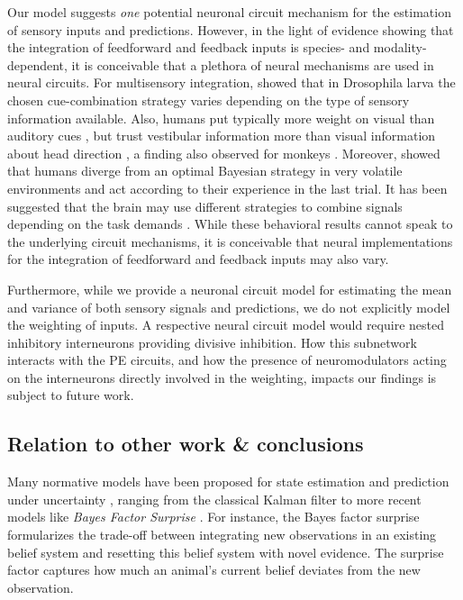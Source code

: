 \documentclass[10pt,a4paper]{article}
\begin{document}
Our model suggests \textit{one} potential neuronal circuit mechanism for the estimation of sensory inputs and predictions. However, in the light of evidence showing that the integration of feedforward and feedback inputs is species- and modality-dependent, it is conceivable that a plethora of neural mechanisms are used in neural circuits. For multisensory integration, \cite{wong2023computational} showed that in Drosophila larva the chosen cue-combination strategy varies depending on the type of sensory information available. Also, humans put typically more weight on visual than auditory cues \citep{battaglia2003bayesian, alais2004ventriloquist}, but trust vestibular information more than visual information about head direction \citep{butler2010bayesian}, a finding also observed for monkeys \citep{fetsch2009dynamic}. Moreover, \cite{summerfield2011perceptual} showed that humans diverge from an optimal Bayesian strategy in very volatile environments and act according to their experience in the last trial. It has been suggested that the brain may use different strategies to combine signals depending on the task demands \citep{o2012can}. While these behavioral results cannot speak to the underlying circuit mechanisms, it is conceivable that neural implementations for the integration of feedforward and feedback inputs may also vary.

Furthermore, while we provide a neuronal circuit model for estimating the mean and variance of both sensory signals and predictions, we do not explicitly model the weighting of inputs. A respective neural circuit model would require nested inhibitory interneurons providing divisive inhibition. How this subnetwork interacts with the PE circuits, and how the presence of neuromodulators acting on the interneurons directly involved in the weighting, impacts our findings is subject to future work. 


\subsection*{Relation to other work \& conclusions}
%
Many normative models have been proposed for state estimation and prediction under uncertainty \citep{soltani2019adaptive}, ranging from the classical Kalman filter to more recent models like \textit{Bayes Factor Surprise} \citep{liakoni2021learning}. For instance, the Bayes factor surprise formularizes the trade-off between integrating new observations in an existing belief system and resetting this belief system with novel evidence. The surprise factor captures how much an animal’s current belief deviates from the new observation. 
\end{document}
